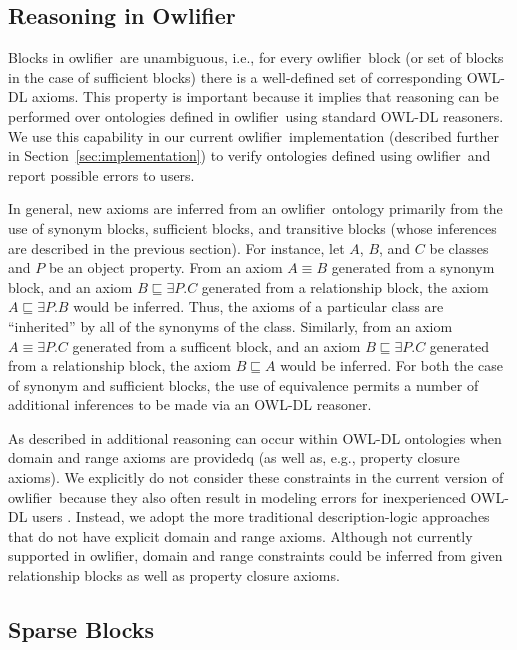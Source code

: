 \documentclass[preprint,number]{elsarticle}
\newcommand{\Owlifier}{\textsf{Owlifier}}
\newcommand{\owlifier}{\textsf{owlifier}}
\newcommand{\secref}[1]{Section~\ref{#1}}
\begin{document}
\subsection{Reasoning in \Owlifier}

Blocks in \owlifier\ are unambiguous, i.e., for every \owlifier\ block
(or set of blocks in the case of sufficient blocks) there is a
well-defined set of corresponding OWL-DL axioms. This property is
important because it implies that reasoning can be performed over
ontologies defined in \owlifier\ using standard OWL-DL reasoners.  We
use this capability in our current \owlifier\ implementation
(described further in \secref{sec:implementation}) to verify
ontologies defined using \owlifier\ and report possible errors to
users.

In general, new axioms are inferred from an \owlifier\ ontology
primarily from the use of synonym blocks, sufficient blocks, and
transitive blocks (whose inferences are described in the previous
section). For instance, let $A$, $B$, and $C$ be classes and $P$ be an
object property. From an axiom $A \equiv B$ generated from a synonym
block, and an axiom $B \sqsubseteq \exists P.C$ generated from a
relationship block, the axiom $A \sqsubseteq \exists P.B$ would be
inferred. Thus, the axioms of a particular class are ``inherited'' by
all of the synonyms of the class. Similarly, from an axiom $A \equiv
\exists P. C$ generated from a sufficent block, and an axiom $B
\sqsubseteq \exists P.C$ generated from a relationship block, the axiom
$B \sqsubseteq A$ would be inferred. For both the case of synonym and
sufficient blocks, the use of equivalence permits a number of
additional inferences to be made via an OWL-DL reasoner.

As described in \cite{rector04:_owl_pizzas} additional reasoning can
occur within OWL-DL ontologies when domain and range axioms are
providedq (as well as, e.g., property closure axioms).  We explicitly
do not consider these constraints in the current version of \owlifier\
because they also often result in modeling errors for inexperienced
OWL-DL users \cite{rector04:_owl_pizzas}. Instead, we adopt the more
traditional description-logic approaches that do not have explicit
domain and range axioms.  Although not currently supported in
\owlifier, domain and range constraints could be inferred from given
relationship blocks as well as property closure axioms. 

\subsection{Sparse Blocks} 
\end{document}
